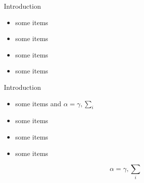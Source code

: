 \documentclass{beamer}
\begin{document}
\begin{frame}{}
\begin{columns}[t]
\begin{column}{.48\linewidth}
			\begin{block}{Introduction}
				\begin{itemize}
					\item some items
					\item some items
					\item some items
					\item some items
				\end{itemize}
			\end{block}

			\begin{block}{Introduction}
				\begin{itemize}
					\item some items and $\alpha=\gamma, \sum_{i}$
					\item some items
					\item some items
					\item some items
				\end{itemize}
				$$\alpha=\gamma, \sum_{i}$$
			\end{block}
		\end{column}
	\end{columns}
\end{frame}
\end{document}

